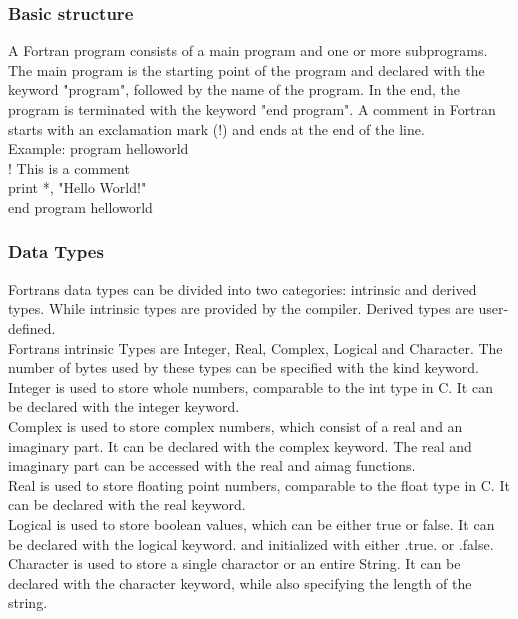 \documentclass[12pt,a4paper]{scrartcl}
\begin{document}
\subsubsection{Basic structure}
A Fortran program consists of a main program and one or more subprograms. The main program is the starting point of the program and declared with the keyword "program", followed by the name of the program. In the end, the program is terminated with the keyword "end program".
A comment in Fortran starts with an exclamation mark (!) and ends at the end of the line.\\
Example:
program helloworld\\
! This is a comment\\
print *, "Hello World!"\\
end program helloworld\\

\subsubsection{Data Types}
Fortrans data types can be divided into two categories: intrinsic and derived types. While intrinsic types are provided by the compiler. Derived types are user-defined.\\
Fortrans intrinsic Types are Integer, Real, Complex, Logical and Character. The number of bytes used by these types can be specified with the kind keyword.\\
Integer is used to store whole numbers, comparable to the int type in C. It can be declared with the integer keyword.\\
Complex is used to store complex numbers, which consist of a real and an imaginary part. It can be declared with the complex keyword. The real and imaginary part can be accessed with the real and aimag functions.\\ %
Real is used to store floating point numbers, comparable to the float type in C. It can be declared with the real keyword.\\
Logical is used to store boolean values, which can be either true or false. It can be declared with the logical keyword. and initialized with either .true. or .false.\\
Character is used to store a single charactor or an entire String. It can be declared with the character keyword, while also specifying the length of the string.
\end{document}

